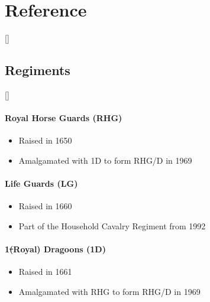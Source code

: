 \part{Reference}

\titleformat{\chapter}[display]{\Huge\bf}{}{0mm}{\centering}[]
\titlespacing{\chapter}{0mm}{0mm}{5mm}

\chapter{Regiments}

\titleformat{\subsection}[display]{\small\bf}{}{0mm}{}[]

\subsection*{Royal Horse Guards (RHG)}

\begin{itemize}
\item Raised in 1650
\item Amalgamated with 1D to form RHG/D in 1969
\end{itemize}

\subsection*{Life Guards (LG)}

\begin{itemize}
\item Raised in 1660
\item Part of the Household Cavalry Regiment from 1992
\end{itemize}

\subsection*{1\st (Royal) Dragoons (1D)}

\begin{itemize}
\item Raised in 1661
\item Amalgamated with RHG to form RHG/D in 1969
\end{itemize}

